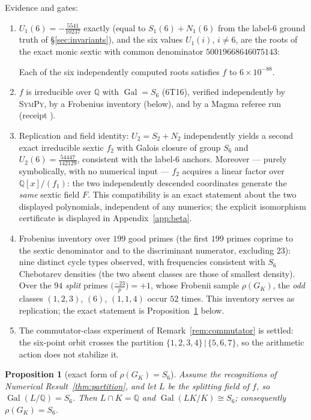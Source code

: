 \documentclass[11pt]{amsart}
\newcommand{\QQ}{\mathbb{Q}}
\newcommand{\GK}{G_{K}}
\theoremstyle{plain}
\newtheorem{proposition}[theorem]{Proposition}
\theoremstyle{definition}
\begin{document}
\noindent Evidence and gates:
\begin{enumerate}
\item $U_1(6)=-\tfrac{5541}{10237}$ exactly (equal to
  $S_1(6)+N_1(6)$ from the label-$6$ ground truth of
  \S\ref{sec:invariants}), and the six values
  $U_1(i)$, $i\neq6$, are the roots of the exact monic sextic with
  common denominator $50019668646075143$:
  \begin{center}\small\SexticTable\end{center}
  Each of the six independently computed roots satisfies $f$ to
  $6\times10^{-88}$.
\item $f$ is irreducible over $\QQ$ with
  $\operatorname{Gal}=S_6$ (6T16), verified independently by
  \textsc{SymPy}, by a Frobenius inventory (below), and by a Magma
  referee run (receipt ).
\item Replication and field identity: $U_2=S_2+N_2$ independently
  yields a second exact irreducible sextic $f_2$ with Galois closure
  of group $S_6$ and $U_2(6)=\tfrac{54447}{142129}$, consistent with
  the label-$6$ anchors. Moreover --- purely symbolically, with no
  numerical input --- $f_2$ acquires a linear factor over
  $\QQ[x]/(f_1)$: the two independently descended coordinates
  generate the \emph{same} sextic field $F$. This compatibility is
  an exact statement about the two displayed polynomials,
  independent of any numerics; the explicit isomorphism certificate
  is displayed in Appendix~\ref{app:beta}.
\item Frobenius inventory over $199$ good primes (the first $199$
  primes coprime to the sextic denominator and to the discriminant
  numerator, excluding $23$): nine distinct cycle types observed,
  with frequencies consistent with $S_6$ Chebotarev densities (the
  two absent classes are those of smallest density). Over the $94$
  \emph{split} primes $\bigl(\tfrac{-23}{p}\bigr)=+1$, whose
  Frobenii sample $\rho(\GK)$, the \emph{odd} classes $(1,2,3)$,
  $(6)$, $(1,1,4)$ occur $52$ times. This inventory serves as
  replication; the exact statement is Proposition~\ref{prop:gk}
  below.
\item The commutator-class experiment of
  Remark~\ref{rem:commutator} is settled: the six-point orbit crosses
  the partition $\{1,2,3,4\}\,|\,\{5,6,7\}$, so the arithmetic action
  does not stabilize it.
\end{enumerate}

\begin{proposition}[exact form of $\rho(\GK)=S_6$]\label{prop:gk}
Assume the recognitions of Numerical
Result~\ref{thm:partition}, and let $L$ be the splitting field of
$f$, so $\operatorname{Gal}(L/\QQ)=S_6$. Then $L\cap K=\QQ$ and
$\operatorname{Gal}(LK/K)\cong S_6$; consequently
$\rho(\GK)=S_6$.
\end{proposition}
\end{document}
